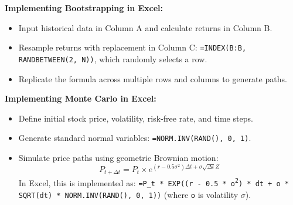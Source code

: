 \textbf{Implementing Bootstrapping in Excel:}
\begin{itemize}
	\item Input historical data in Column A and calculate returns in Column B.
	\item Resample returns with replacement in Column C: \texttt{=INDEX(B:B, RANDBETWEEN(2, N))}, which randomly selects a row.
	\item Replicate the formula across multiple rows and columns to generate paths.
\end{itemize}

\textbf{Implementing Monte Carlo in Excel:}
\begin{itemize}
	\item Define initial stock price, volatility, risk-free rate, and time steps.
	\item Generate standard normal variables: \texttt{=NORM.INV(RAND(), 0, 1)}.
	\item Simulate price paths using geometric Brownian motion:
	\begin{equation}
		P_{t+\Delta t} = P_t \times e^{(r-0.5\sigma^2)\Delta t + \sigma \sqrt{\Delta t} Z}
		\label{eq:gbm_price_step_m9}
	\end{equation}
	In Excel, this is implemented as:
	\texttt{=P\_t * EXP((r - 0.5 * o\textsuperscript{2}) * dt + o * SQRT(dt) * NORM.INV(RAND(), 0, 1))} (where \texttt{o} is volatility $\sigma$).
\end{itemize}

% 
